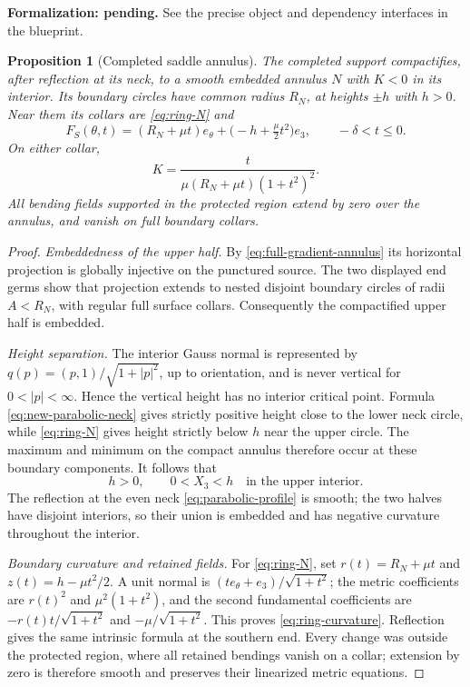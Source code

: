 \documentclass[11pt]{amsart}
\newtheorem{proposition}[theorem]{Proposition}
\theoremstyle{definition}
\theoremstyle{remark}
\numberwithin{equation}{section}
\begin{document}
\par\noindent\textbf{Formalization: pending.} See the precise object and dependency interfaces in the blueprint.\par
\begin{proposition}[Completed saddle annulus]\label{prop:saddle}
The completed support compactifies, after reflection at its neck,
to a smooth embedded annulus $N$ with $K<0$ in its interior. Its
boundary circles have common radius $R_N$, at heights $\pm h$ with
$h>0$. Near them its collars are \eqref{eq:ring-N} and
\begin{equation}\label{eq:ring-S}
 F_S(\theta,t)=(R_N+\mu t)e_\theta
       +\bigl(-h+\tfrac\mu2t^2\bigr)e_3,
 \qquad -\delta<t\le0.
\end{equation}
On either collar,
\begin{equation}\label{eq:ring-curvature}
 K=\frac{t}{\mu(R_N+\mu t)(1+t^2)^2}.
\end{equation}
All bending fields supported in the protected region extend by zero
over the annulus, and vanish on full boundary collars.
\end{proposition}
\begin{proof}
\emph{Embeddedness of the upper half.}
By \eqref{eq:full-gradient-annulus} its horizontal projection is
globally injective on the punctured source. The two displayed end
germs show that projection extends to nested disjoint boundary
circles of radii $A<R_N$, with regular full surface collars.
Consequently the compactified upper half is embedded.

\emph{Height separation.}
The interior Gauss normal is represented by
$q(p)=(p,1)/\sqrt{1+|p|^2}$, up to orientation, and is never vertical
for $0<|p|<\infty$. Hence the vertical height has no interior
critical point. Formula \eqref{eq:new-parabolic-neck} gives strictly
positive height close to the lower neck circle, while
\eqref{eq:ring-N} gives height strictly below $h$ near the upper
circle. The maximum and minimum on the compact annulus therefore
occur at these boundary components. It follows that
\[
 h>0,\qquad 0<X_3<h\quad\text{in the upper interior}.
\]
The reflection at the even neck \eqref{eq:parabolic-profile} is
smooth; the two halves have disjoint interiors, so their union is
embedded and has negative curvature throughout the interior.

\emph{Boundary curvature and retained fields.}
For \eqref{eq:ring-N}, set $r(t)=R_N+\mu t$ and
$z(t)=h-\mu t^2/2$. A unit normal is
$(t e_\theta+e_3)/\sqrt{1+t^2}$; the metric coefficients are
$r(t)^2$ and $\mu^2(1+t^2)$, and the second fundamental
coefficients are $-r(t)t/\sqrt{1+t^2}$ and
$-\mu/\sqrt{1+t^2}$. This proves \eqref{eq:ring-curvature}.
Reflection gives the same intrinsic formula at the southern end.
Every change was outside the protected region, where all retained
bendings vanish on a collar; extension by zero is therefore smooth
and preserves their linearized metric equations.
\end{proof}
\end{document}
